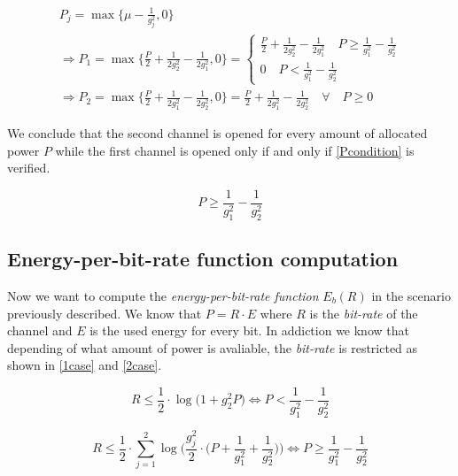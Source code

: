 \begin{equation}
	\begin{gathered}
	 P_j = \max\Big\{\mu - \frac{1}{g_j^2},0\Big\} \\
	 \Rightarrow P_1= \max\Big\{\frac{P}{2} + \frac{1}{2g_2^2} - \frac{1}{2g_1^2},0\Big\} = \begin{cases}
	  \frac{P}{2} + \frac{1}{2g_2^2} - \frac{1}{2g_1^2} \quad P \geq \frac{1}{g_1^2} - \frac{1}{g_2^2} \\
		0 \quad P < \frac{1}{g_1^2} - \frac{1}{g_2^2}
	 \end{cases} \\
	 \Rightarrow P_2= \max\Big\{\frac{P}{2} + \frac{1}{2g_1^2} - \frac{1}{2g_2^2},0\Big\} = \frac{P}{2} + \frac{1}{2g_1^2} - \frac{1}{2g_2^2} \quad \forall \quad P \geq 0
	\end{gathered}
\end{equation}

We conclude that the second channel is opened for every amount of allocated power $P$ while the first channel is opened only if and only if \eqref{Pcondition} is verified.

\begin{equation}
	P \geq \frac{1}{g_1^2} - \frac{1}{g_2^2}
	\label{Pcondition}
\end{equation}

\subsection{Energy-per-bit-rate function computation}

Now we want to compute the \textit{energy-per-bit-rate function} $E_b(R)$ in the scenario previously described. We know that $P = R \cdot E$ where $R$ is the \textit{bit-rate} of the channel and $E$ is the used energy for every bit. In addiction we know that depending of what amount of power is avaliable, the \textit{bit-rate} is restricted as shown in \eqref{1case} and \eqref{2case}.

\begin{equation}
		R \leq \frac{1}{2} \cdot \log\big( 1 + g_2^2P \big) \Leftrightarrow P < \frac{1}{g_1^2} - \frac{1}{g_2^2}
		\label{1case}
\end{equation}


\begin{equation}
		R \leq \frac{1}{2} \cdot \sum_{j=1}^2 \log\Big(\frac{g_j^2}{2} \cdot \Big(P+\frac{1}{g_1^2} + \frac{1}{g_2^2}\Big)\Big) \Leftrightarrow P \geq \frac{1}{g_1^2} - \frac{1}{g_2^2}
		\label{2case}
\end{equation}

